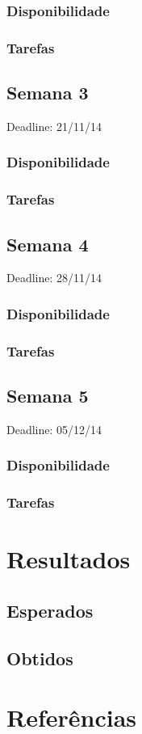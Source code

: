\documentclass[a4paper]{article}
\begin{document}
\subsubsection{Disponibilidade}
\subsubsection{Tarefas}

\subsection{Semana 3}
Deadline: 21/11/14
\subsubsection{Disponibilidade}
\subsubsection{Tarefas}

\subsection{Semana 4}
Deadline: 28/11/14
\subsubsection{Disponibilidade}
\subsubsection{Tarefas}

\subsection{Semana 5}
Deadline: 05/12/14
\subsubsection{Disponibilidade}
\subsubsection{Tarefas}

\pagebreak

\section{Resultados}

\subsection{Esperados}
\subsection{Obtidos}

\pagebreak

\section{Referências}
\end{document}
